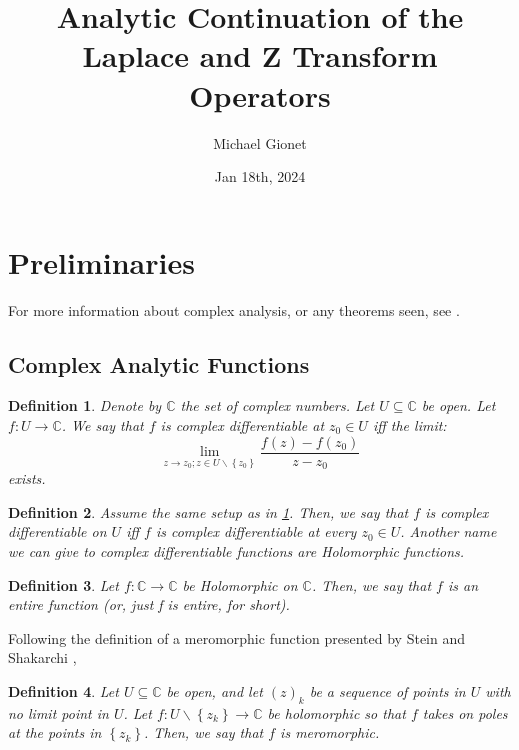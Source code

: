 \documentclass{article}
\title{Analytic Continuation of the Laplace and Z Transform Operators}
\author{Michael Gionet}
\date{Jan 18th, 2024}
\newtheorem{definition}{Definition}
\begin{document}
	\maketitle
	
	\section{Preliminaries}
	
	For more information about complex analysis, or any theorems seen, see \cite{steinComplexAnalysis}.
	
	\subsection{Complex Analytic Functions}
	
	\begin{definition} \label{def_complex_diff_point}
		Denote by $\mathbb{C}$ the set of complex numbers. 
		Let $ U \subseteq \mathbb{C} $ be open. 
		Let $ f : U \rightarrow \mathbb{C} $. 
		We say that $f$ is complex differentiable at $z_0 \in U$ iff the limit:
		$$ \lim_{ z \rightarrow z_0; z \in U \backslash \left\{ z_0 \right\} } \frac{ f(z) - f(z_0) }{ z - z_0 } $$
		exists. 
	\end{definition}

	\begin{definition} \label{ def_complex_diff_domain }
		Assume the same setup as in \ref{def_complex_diff_point}. Then, we say that $f$ is complex differentiable on $U$ iff $f$ is complex differentiable at every $z_0 \in U$. Another name we can give to complex differentiable functions are Holomorphic functions. 
	\end{definition}

	\begin{definition} \label{ def_entire_function }
		Let $f : \mathbb{C} \rightarrow \mathbb{C}$ be Holomorphic on $\mathbb{C}$. Then, we say that $f$ is an entire function (or, just f is entire, for short).
	\end{definition}

	Following the definition of a meromorphic function presented by Stein and Shakarchi \cite{steinComplexAnalysis},
	\begin{definition} \label{ def_meromorphic }
		Let $U \subseteq \mathbb{C}$ be open, and let $(z)_k$ be a sequence of points in $U$ with no limit point in $U$. 
		Let $f : U \backslash \left\{z_k \right\} \rightarrow \mathbb{C} $ be holomorphic so that $f$ takes on poles at the points in $\left\{ z_k \right\}$. Then, we say that $f$ is meromorphic.
	\end{definition}
\end{document}
